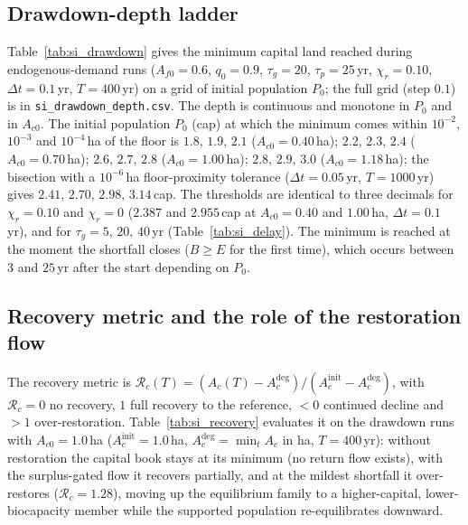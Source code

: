 \subsection{Drawdown-depth ladder}\label{si:ladder}

Table~\ref{tab:si_drawdown} gives the minimum capital land reached during endogenous-demand runs ($A_{f0}=0.6$, $q_0=0.9$, $\tau_g=20$, $\tau_p=25$\,yr, $\chi_r=0.10$, $\Delta t=0.1$\,yr, $T=400$\,yr) on a grid of initial population $P_0$; the full grid (step $0.1$) is in \texttt{si\_drawdown\_depth.csv}. The depth is continuous and monotone in $P_0$ and in $A_{c0}$. The initial population $P_0$ (cap) at which the minimum comes within $10^{-2}$, $10^{-3}$ and $10^{-4}$\,ha of the floor is $1.8,\,1.9,\,2.1$ ($A_{c0}=0.40$\,ha); $2.2,\,2.3,\,2.4$ ($A_{c0}=0.70$\,ha); $2.6,\,2.7,\,2.8$ ($A_{c0}=1.00$\,ha); $2.8,\,2.9,\,3.0$ ($A_{c0}=1.18$\,ha); the bisection with a $10^{-6}$\,ha floor-proximity tolerance ($\Delta t=0.05$\,yr, $T=1000$\,yr) gives $2.41,\,2.70,\,2.98,\,3.14$\,cap. The thresholds are identical to three decimals for $\chi_r=0.10$ and $\chi_r=0$ ($2.387$ and $2.955$\,cap at $A_{c0}=0.40$ and $1.00$\,ha, $\Delta t=0.1$\,yr), and for $\tau_g=5,\,20,\,40$\,yr (Table~\ref{tab:si_delay}). The minimum is reached at the moment the shortfall closes ($B\ge E$ for the first time), which occurs between $3$ and $25$\,yr after the start depending on $P_0$.

\begin{table}[htbp]
\centering\small
\caption{Minimum capital land $\min_tA_c$ (ha) reached during the run, by initial capital $A_{c0}$ (rows, ha) and initial population $P_0$ (columns, cap); typed floor $\Acmin=0.05$\,ha.}
\label{tab:si_drawdown}

\end{table}

\subsection{Recovery metric and the role of the restoration flow}\label{si:recovery}

The recovery metric is $\mathcal R_c(T)=(A_c(T)-A_c^{\mathrm{deg}})/(A_c^{\mathrm{init}}-A_c^{\mathrm{deg}})$, with $\mathcal R_c=0$ no recovery, $1$ full recovery to the reference, $<0$ continued decline and $>1$ over-restoration. Table~\ref{tab:si_recovery} evaluates it on the drawdown runs with $A_{c0}=1.0$\,ha ($A_c^{\mathrm{init}}=1.0$\,ha, $A_c^{\mathrm{deg}}=\min_tA_c$ in ha, $T=400$\,yr): without restoration the capital book stays at its minimum (no return flow exists), with the surplus-gated flow it recovers partially, and at the mildest shortfall it over-restores ($\mathcal R_c=1.28$), moving up the equilibrium family to a higher-capital, lower-biocapacity member while the supported population re-equilibrates downward.

